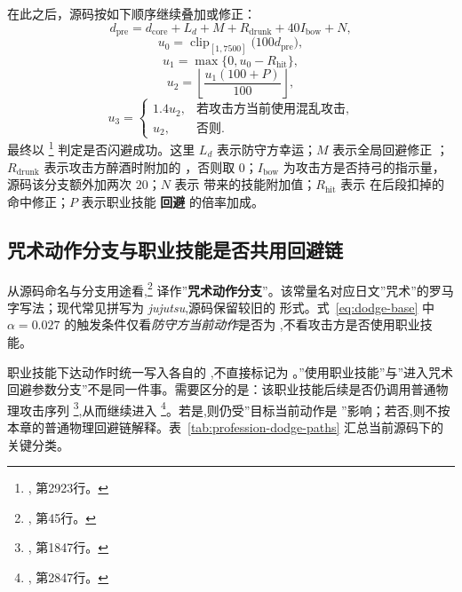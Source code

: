 在此之后，源码按如下顺序继续叠加或修正：
\begin{equation}
    d_{\mathrm{pre}} = d_{\mathrm{core}} + L_d + M + R_{\mathrm{drunk}} + 40I_{\mathrm{bow}} + N,
\end{equation}
\begin{equation}
    u_0 = \operatorname{clip}_{[1,7500]}\!\bigl(100d_{\mathrm{pre}}\bigr),
\end{equation}
\begin{equation}
    u_1 = \max\{0, u_0 - R_{\mathrm{hit}}\},
\end{equation}
\begin{equation}
    u_2 = \left\lfloor \frac{u_1(100+P)}{100} \right\rfloor,
\end{equation}
\begin{equation}
    u_3 = \begin{cases}
        1.4u_2, & \text{若攻击方当前使用混乱攻击}, \\
        u_2, & \text{否则}.
    \end{cases}
\end{equation}
最终以 \footnote{, 第2923行。} 判定是否闪避成功。这里 $L_d$ 表示防守方幸运；$M$ 表示全局回避修正 ；$R_{\mathrm{drunk}}$ 表示攻击方醉酒时附加的 ，否则取 $0$；$I_{\mathrm{bow}}$ 为攻击方是否持弓的指示量，源码该分支额外加两次 $20$；$N$ 表示  带来的技能附加值；$R_{\mathrm{hit}}$ 表示  在后段扣掉的命中修正；$P$ 表示职业技能 \textbf{回避} 的倍率加成。


\subsection{咒术动作分支与职业技能是否共用回避链}

从源码命名与分支用途看,\footnote{, 第45行。} 译作”\textbf{咒术动作分支}”。该常量名对应日文”咒术”的罗马字写法；现代常见拼写为 \emph{jujutsu},源码保留较旧的  形式。式~\eqref{eq:dodge-base} 中 $\alpha=0.027$ 的触发条件仅看\emph{防守方当前动作}是否为 ,不看攻击方是否使用职业技能。

职业技能下达动作时统一写入各自的 ,不直接标记为 。”使用职业技能”与”进入咒术回避参数分支”不是同一件事。需要区分的是：该职业技能后续是否仍调用普通物理攻击序列 \footnote{, 第1847行。},从而继续进入 \footnote{, 第2847行。}。若是,则仍受”目标当前动作是 ”影响；若否,则不按本章的普通物理回避链解释。表~\ref{tab:profession-dodge-paths} 汇总当前源码下的关键分类。

